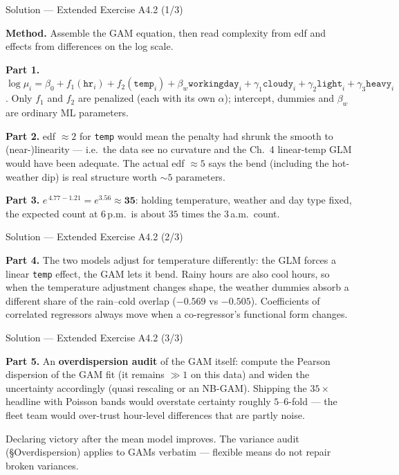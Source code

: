 \documentclass[aspectratio=169,11pt]{beamer}
\begin{document}
\begin{frame}{Solution --- Extended Exercise A4.2 (1/3)}
\begin{solutionbox}
  \textbf{Method.} Assemble the GAM equation, then read complexity from edf and
  effects from differences on the log scale.

  \textbf{Part 1.}
  $\log\mu_i = \beta_0 + f_1(\texttt{hr}_i) + f_2(\texttt{temp}_i)
  + \beta_w \texttt{workingday}_i + \gamma_1\texttt{cloudy}_i
  + \gamma_2\texttt{light}_i + \gamma_3\texttt{heavy}_i$.
  Only $f_1$ and $f_2$ are penalized (each with its own $\alpha$); intercept, dummies
  and $\beta_w$ are ordinary ML parameters.

  \textbf{Part 2.} edf $\approx 2$ for \texttt{temp} would mean the penalty had shrunk
  the smooth to (near-)linearity --- i.e.\ the data see no curvature and the Ch.\ 4
  linear-temp GLM would have been adequate. The actual edf $\approx 5$ says the bend
  (including the hot-weather dip) is real structure worth $\sim\!5$ parameters.

  \textbf{Part 3.} $e^{\,4.77 - 1.21} = e^{3.56} \approx \mathbf{35}$: holding
  temperature, weather and day type fixed, the expected count at 6\,p.m.\ is about
  $35$ times the 3\,a.m.\ count.
\end{solutionbox}
\end{frame}

\begin{frame}{Solution --- Extended Exercise A4.2 (2/3)}
\begin{solutionbox}
  \textbf{Part 4.} The two models adjust for temperature differently: the GLM forces a
  linear \texttt{temp} effect, the GAM lets it bend. Rainy hours are also cool hours,
  so when the temperature adjustment changes shape, the weather dummies absorb a
  different share of the rain--cold overlap ($-0.569$ vs $-0.505$). Coefficients of
  correlated regressors always move when a co-regressor's functional form changes.
\end{solutionbox}
\end{frame}

\begin{frame}{Solution --- Extended Exercise A4.2 (3/3)}
\begin{solutionbox}
  \textbf{Part 5.} An \textbf{overdispersion audit} of the GAM itself: compute the
  Pearson dispersion of the GAM fit (it remains $\gg 1$ on this data) and widen the
  uncertainty accordingly (quasi rescaling or an NB-GAM). Shipping the $35\times$
  headline with Poisson bands would overstate certainty roughly $5$--$6$-fold ---
  the fleet team would over-trust hour-level differences that are partly noise.
\end{solutionbox}
\begin{mistake}
  Declaring victory after the mean model improves. The variance audit
  (\S Overdispersion) applies to GAMs verbatim --- flexible means do not repair
  broken variances.
\end{mistake}
\end{frame}
\end{document}
